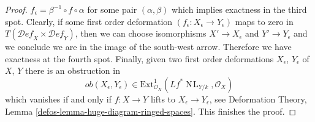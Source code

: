 \documentclass[10pt,a4paper]{amsart}
\theoremstyle{plain}
\theoremstyle{definition}
\theoremstyle{remark}
\numberwithin{equation}{subsection}
\def\NL{\mathop{N\!L}\nolimits}
\def\Deformationcategory{\mathcal{D}\!\mathit{ef}}
\begin{document}
\begin{proof}
$f_\epsilon  = \beta^{-1} \circ f \circ \alpha$ for some
pair $(\alpha, \beta)$ which implies exactness in the third spot.
Clearly, if some first order deformation
$(f_\epsilon : X_\epsilon \to Y_\epsilon)$
maps to zero in $T(\Deformationcategory_X \times \Deformationcategory_Y)$,
then we can choose isomorphisms $X' \to X_\epsilon$ and $Y' \to Y_\epsilon$
and we conclude we are in the image of the south-west arrow.
Therefore we have exactness at the fourth spot.
Finally, given two first order deformations $X_\epsilon$, $Y_\epsilon$
of $X$, $Y$ there is an obstruction in
$$
ob(X_\epsilon, Y_\epsilon) \in
\text{Ext}^1_{\mathcal{O}_X}(Lf^*\NL_{Y/k}, \mathcal{O}_X)
$$
which vanishes if and only if $f : X \to Y$ lifts to
$X_\epsilon \to Y_\epsilon$, see
Deformation Theory, Lemma \ref{defos-lemma-huge-diagram-ringed-spaces}.
This finishes the proof.
\end{proof}
\end{document}
